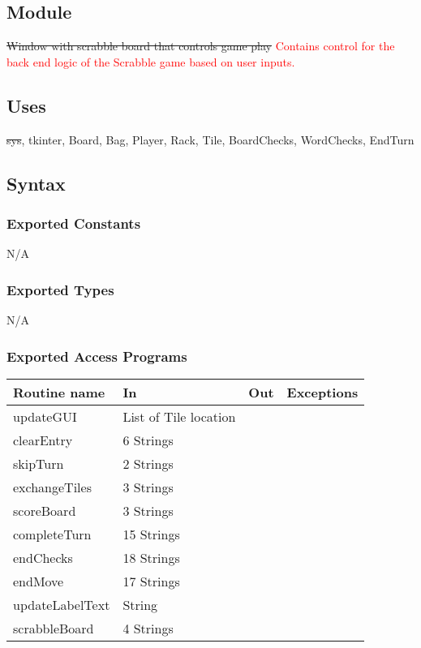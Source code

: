 \documentclass[12pt]{article}
\begin{document}
\subsection*{Module}

\sout{Window with scrabble board that controls game play} \textcolor{red}{Contains control for the back end logic of the Scrabble game based on user inputs.}

\subsection*{Uses}

\sout{sys}, tkinter, Board, Bag, Player, Rack, Tile, BoardChecks, WordChecks, EndTurn


\subsection*{Syntax}

\subsubsection*{Exported Constants}
N/A
\subsubsection*{Exported Types}

N/A

\subsubsection* {Exported Access Programs}

\begin{tabular}{| l | l | l | l |}
\hline
\textbf{Routine name} & \textbf{In} & \textbf{Out} & \textbf{Exceptions}\\
\hline
updateGUI & List of Tile location & & \\
\hline
clearEntry & 6 Strings &  & \\
\hline
skipTurn & 2 Strings & & \\
\hline
exchangeTiles & 3 Strings & & \\
\hline
scoreBoard & 3 Strings & & \\
\hline
completeTurn & 15 Strings & & \\
\hline
endChecks & 18 Strings & & \\
\hline
endMove & 17 Strings & & \\
\hline
updateLabelText & String & & \\
\hline
scrabbleBoard & 4 Strings & & \\
\hline
\end{tabular}
\end{document}
